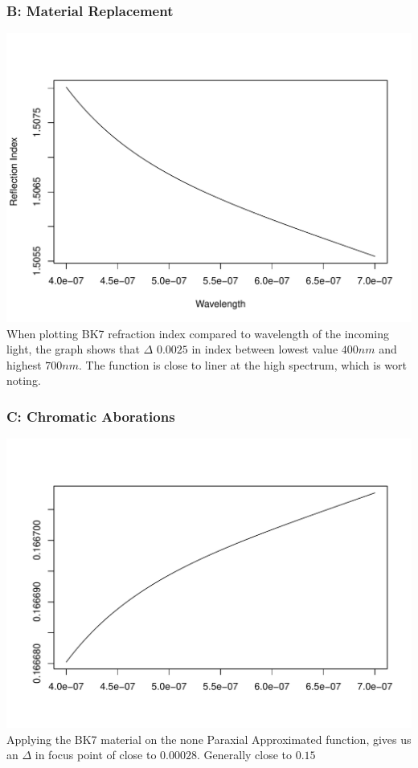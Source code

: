 \documentclass[12pt]{article}
\begin{document}
\subsubsection{B: Material Replacement}
\includegraphics[scale=0.6]{BK7_index.pdf}
When plotting BK7 refraction index compared to wavelength of the incoming light,
the graph shows that $\Delta$ $0.0025$ in index between lowest value 
$400 nm$ and highest $700 nm$.
The function is close to liner at the high spectrum, which is wort noting.

\subsubsection{C: Chromatic Aborations}
\includegraphics[scale=0.6]{BK7_abo.pdf}
Applying the BK7 material on the none Paraxial Approximated function, gives us
an $\Delta$ in focus point of close to $0.00028$. Generally close to $0.15$
\end{document}
